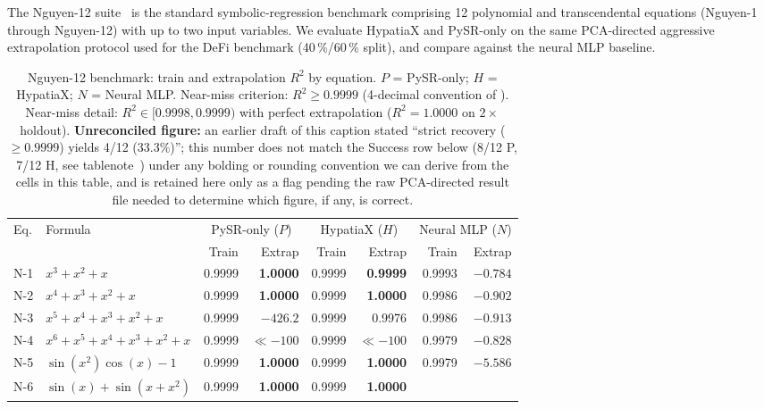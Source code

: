 \documentclass[twoside,11pt]{article}
\newcommand{\Rsq}{R^{2}}
\begin{document}
The Nguyen-12 suite~\citep{uy2011semantically} is the standard symbolic-regression
benchmark comprising 12 polynomial and transcendental equations (Nguyen-1 through
Nguyen-12) with up to two input variables.  We evaluate HypatiaX and PySR-only on
the same PCA-directed aggressive extrapolation protocol used for the DeFi benchmark
(40\,\%/60\,\% split), and compare against the neural MLP baseline.

\begin{table}[h]
\centering
\caption{Nguyen-12 benchmark: train and extrapolation $\Rsq$ by equation.
$P$ = PySR-only; $H$ = HypatiaX; $N$ = Neural MLP.
Near-miss criterion: $\Rsq \ge 0.9999$ (4-decimal convention of
\citealt{uy2011semantically}).
Near-miss detail: $\Rsq\in[0.9998,0.9999)$ with perfect extrapolation
($\Rsq=1.0000$ on $2\times$ holdout). \textbf{Unreconciled figure:} an earlier
draft of this caption stated ``strict recovery ($\ge 0.9999$) yields 4/12
(33.3\%)''; this number does not match the Success row below (8/12 P, 7/12 H,
see tablenote~\ddag) under any bolding or rounding convention we can derive
from the cells in this table, and is retained here only as a flag pending
the raw PCA-directed result file needed to determine which figure, if any,
is correct.}
\label{tab:nguyen12}
\begin{threeparttable}
\begin{tabular}{llrrrrrr}
\toprule
Eq. & Formula &
  \multicolumn{2}{c}{PySR-only ($P$)} &
  \multicolumn{2}{c}{HypatiaX ($H$)} &
  \multicolumn{2}{c}{Neural MLP ($N$)} \\
\cmidrule(lr){3-4}\cmidrule(lr){5-6}\cmidrule(lr){7-8}
 &  & Train & Extrap & Train & Extrap & Train & Extrap \\
\midrule
N-1  & $x^3 + x^2 + x$
  & 0.9999 & \textbf{1.0000}
  & 0.9999 & \textbf{0.9999}
  & 0.9993 & $-0.784$ \\
N-2  & $x^4 + x^3 + x^2 + x$
  & 0.9999 & \textbf{1.0000}
  & 0.9999 & \textbf{1.0000}
  & 0.9986 & $-0.902$ \\
N-3  & $x^5 + x^4 + x^3 + x^2 + x$
  & 0.9999 & \emph{$-426.2$}
  & 0.9999 & 0.9976
  & 0.9986 & $-0.913$ \\
N-4  & $x^6 + x^5 + x^4 + x^3 + x^2 + x$
  & 0.9999 & \emph{$\ll{-}100$}
  & 0.9999 & \emph{$\ll{-}100$}
  & 0.9979 & $-0.828$ \\
N-5  & $\sin(x^2)\cos(x)-1$
  & 0.9999 & \textbf{1.0000}
  & 0.9999 & \textbf{1.0000}
  & 0.9979 & $-5.586$ \\
N-6  & $\sin(x)+\sin(x+x^2)$
  & 0.9999 & \textbf{1.0000}
  & 0.9999 & \textbf{1.0000}

\end{tabular}
\end{threeparttable}
\end{table}
\end{document}
